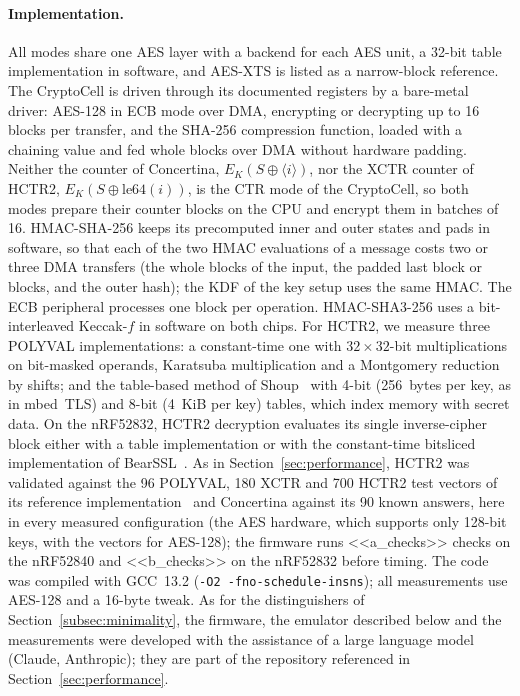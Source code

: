 \paragraph{Implementation.}
All modes share one AES layer with a backend for each AES unit, a 32-bit
table implementation in software, and AES-XTS is listed as a narrow-block
reference. The CryptoCell is driven through its documented registers by a
bare-metal driver: AES-128 in ECB mode over DMA, encrypting or decrypting up
to 16 blocks per transfer, and the SHA-256 compression function, loaded with
a chaining value and fed whole blocks over DMA without hardware padding.
Neither the counter of Concertina, $E_K(S \oplus \langle i \rangle)$, nor the
XCTR counter of HCTR2, $E_K(S \oplus \mathrm{le64}(i))$, is the CTR mode of
the CryptoCell, so both modes prepare their counter blocks on the CPU and
encrypt them in batches of 16. HMAC-SHA-256 keeps its precomputed inner and
outer states and pads in software, so that each of the two HMAC evaluations
of a message costs two or three DMA transfers (the whole blocks of the
input, the padded last block or blocks, and the outer hash); the KDF of the
key setup uses the same HMAC. The ECB peripheral
processes one block per operation. HMAC-SHA3-256 uses a bit-interleaved
Keccak-$f$ in software on both chips. For HCTR2, we measure three POLYVAL
implementations: a constant-time one with $32 \times 32$-bit
multiplications on bit-masked operands, Karatsuba multiplication and a
Montgomery reduction by shifts; and the table-based method of
Shoup~\cite{ShoupGCM} with 4-bit (256~bytes per key, as in mbed~TLS) and
8-bit (4~KiB per key) tables, which index memory with secret data. On the
nRF52832, HCTR2 decryption evaluates its single inverse-cipher block either
with a table implementation or with the constant-time bitsliced
implementation of BearSSL~\cite{BearSSL}. As in
Section~\ref{sec:performance}, HCTR2 was validated against the 96 POLYVAL,
180 XCTR and 700 HCTR2 test vectors of its reference
implementation~\cite{HCTR2} and Concertina against its 90 known answers, here
in every measured configuration (the AES hardware, which supports only
128-bit keys, with the vectors for AES-128); the firmware runs
<<a_checks>> checks on the nRF52840 and <<b_checks>> on the nRF52832 before
timing. The code was compiled with GCC~13.2 (\texttt{-O2
-fno-schedule-insns}); all measurements use AES-128 and a 16-byte tweak. As
for the distinguishers of Section~\ref{subsec:minimality}, the firmware, the
emulator described below and the measurements were developed with the
assistance of a large language model (Claude, Anthropic); they are part of
the repository referenced in Section~\ref{sec:performance}.

